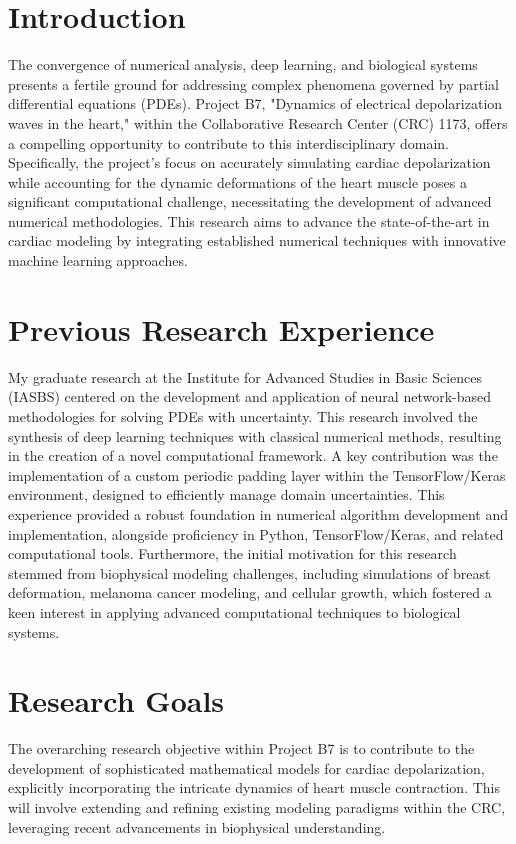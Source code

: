 \documentclass[10pt, a4paper]{article}
\begin{document}

	\section*{Introduction}
	The convergence of numerical analysis, deep learning, and biological systems presents a fertile ground for addressing complex phenomena governed by partial differential equations (PDEs). Project B7, "Dynamics of electrical depolarization waves in the heart," within the Collaborative Research Center (CRC) 1173, offers a compelling opportunity to contribute to this interdisciplinary domain. Specifically, the project's focus on accurately simulating cardiac depolarization while accounting for the dynamic deformations of the heart muscle poses a significant computational challenge, necessitating the development of advanced numerical methodologies. This research aims to advance the state-of-the-art in cardiac modeling by integrating established numerical techniques with innovative machine learning approaches.
	\section*{Previous Research Experience}
	My graduate research at the Institute for Advanced Studies in Basic Sciences (IASBS) centered on the development and application of neural network-based methodologies for solving PDEs with uncertainty. This research involved the synthesis of deep learning techniques with classical numerical methods, resulting in the creation of a novel computational framework. A key contribution was the implementation of a custom periodic padding layer within the TensorFlow/Keras environment, designed to efficiently manage domain uncertainties. This experience provided a robust foundation in numerical algorithm development and implementation, alongside proficiency in Python, TensorFlow/Keras, and related computational tools. Furthermore, the initial motivation for this research stemmed from biophysical modeling challenges, including simulations of breast deformation, melanoma cancer modeling, and cellular growth, which fostered a keen interest in applying advanced computational techniques to biological systems.
	\section*{Research Goals}
	The overarching research objective within Project B7 is to contribute to the development of sophisticated mathematical models for cardiac depolarization, explicitly incorporating the intricate dynamics of heart muscle contraction. This will involve extending and refining existing modeling paradigms within the CRC, leveraging recent advancements in biophysical understanding.
	
\end{document}
